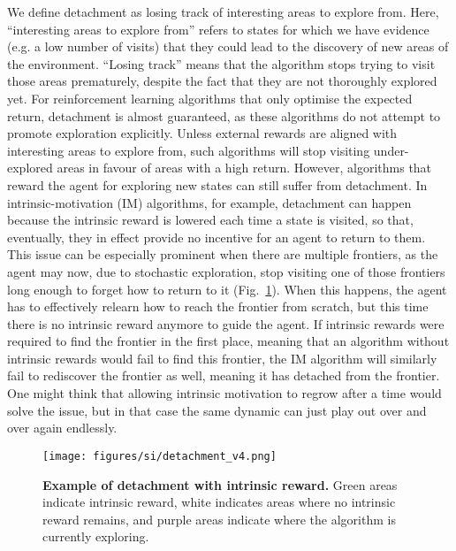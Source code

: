 \documentclass{nature}
\begin{document}
We define detachment as losing track of interesting areas to explore from. 
Here, ``interesting areas to explore from'' refers to states for which we have evidence (e.g. a low number of visits) that they could lead to the discovery of new areas of the environment.
``Losing track'' means that the algorithm stops trying to visit those areas prematurely, despite the fact that they are not thoroughly explored yet.
For reinforcement learning algorithms that only optimise the expected return, detachment is almost guaranteed, as these algorithms do not attempt to promote exploration explicitly. Unless external rewards are aligned with interesting areas to explore from, such algorithms will stop visiting under-explored areas in favour of areas with a high return.
However, algorithms that reward the agent for exploring new states can still suffer from detachment.
In intrinsic-motivation (IM) algorithms, for example,  detachment can happen because the intrinsic reward is lowered each time a state is visited, so that, eventually, they in effect provide no incentive for an agent to return to them.
This issue can be especially prominent when there are multiple frontiers, as the agent may now, due to stochastic exploration, stop visiting one of those frontiers long enough to forget how to return to it (Fig.~\ref{fig:detachment}). 
When this happens, the agent has to effectively relearn how to reach the frontier from scratch, but this time there is no intrinsic reward anymore to guide the agent.
If intrinsic rewards were required to find the frontier in the first place, meaning that an algorithm without intrinsic rewards would fail to find this frontier, the IM algorithm will similarly fail to rediscover the frontier as well, meaning it has detached from the frontier. 
One might think that allowing intrinsic motivation to regrow after a time would solve the issue, but in that case the same dynamic can just play out over and over again endlessly.

\begin{figure}[tb!]
    \centering
    \texttt{[image: figures/si/detachment\_v4.png]}
    \caption{\textbf{Example of detachment with intrinsic reward.} Green areas indicate intrinsic reward, white indicates areas where no intrinsic reward remains, and purple areas indicate where the algorithm is currently exploring.}
    \label{fig:detachment}
\end{figure}
\end{document}
